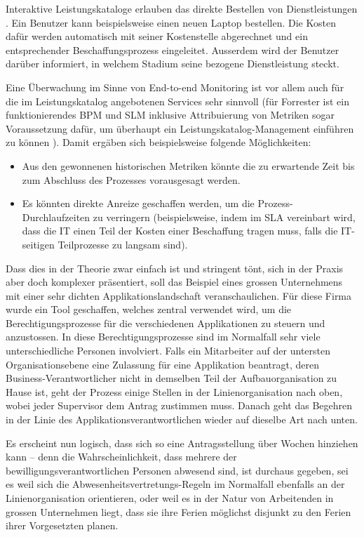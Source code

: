 \documentclass[11pt,listof=totoc]{scrreprt} %
\theoremstyle{definition}
\begin{document}
Interaktive Leistungskataloge erlauben das direkte Bestellen von Dienstleistungen \cite{troysblog, purdue}. Ein Benutzer kann beispielsweise einen neuen Laptop bestellen. Die Kosten dafür werden automatisch mit seiner Kostenstelle abgerechnet und ein entsprechender Beschaffungsprozess eingeleitet. Ausserdem wird der Benutzer darüber informiert, in welchem Stadium seine bezogene Dienstleistung steckt.

Eine Überwachung im Sinne von End-to-end Monitoring ist vor allem auch für die im Leistungskatalog angebotenen Services sehr sinnvoll (für Forrester ist ein funktionierendes BPM und SLM inklusive Attribuierung von Metriken sogar Voraussetzung dafür, um überhaupt ein Leistungskatalog-Management einführen zu können \cite{stephenmann}). Damit ergäben sich beispielsweise folgende Möglichkeiten:
\begin{itemize}
\item Aus den gewonnenen historischen Metriken könnte die zu erwartende Zeit bis zum Abschluss des Prozesses vorausgesagt werden.
\item Es könnten direkte Anreize geschaffen werden, um die Prozess-Durchlaufzeiten zu verringern (beispielsweise, indem im SLA vereinbart wird, dass die IT einen Teil der Kosten einer Beschaffung tragen muss, falls die IT-seitigen Teilprozesse zu langsam sind).
\end{itemize}

Dass dies in der Theorie zwar einfach ist und stringent tönt, sich in der Praxis aber doch komplexer präsentiert, soll das Beispiel eines grossen Unternehmens mit einer sehr dichten Applikationslandschaft veranschaulichen. Für diese Firma wurde ein Tool geschaffen, welches zentral verwendet wird, um die Berechtigungsprozesse für die verschiedenen Applikationen zu steuern und anzustossen. In diese Berechtigungsprozesse sind im Normalfall sehr viele unterschiedliche Personen involviert. Falls ein Mitarbeiter auf der untersten Organisationsebene eine Zulassung für eine Applikation beantragt, deren Business-Verantwortlicher nicht in demselben Teil der Aufbauorganisation zu Hause ist, geht der Prozess einige Stellen in der Linienorganisation nach oben, wobei jeder Supervisor dem Antrag zustimmen muss. Danach geht das Begehren in der Linie des Applikationsverantwortlichen wieder auf dieselbe Art nach unten.

Es erscheint nun logisch, dass sich so eine Antragsstellung über Wochen hinziehen kann -- denn die Wahrscheinlichkeit, dass mehrere der bewilligungsverantwortlichen Personen abwesend sind, ist durchaus gegeben, sei es weil sich die Abwesenheitsvertretungs-Regeln im Normalfall ebenfalls an der Linienorganisation orientieren, oder weil es in der Natur von Arbeitenden in grossen Unternehmen liegt, dass sie ihre Ferien möglichst disjunkt zu den Ferien ihrer Vorgesetzten planen.
\end{document}
